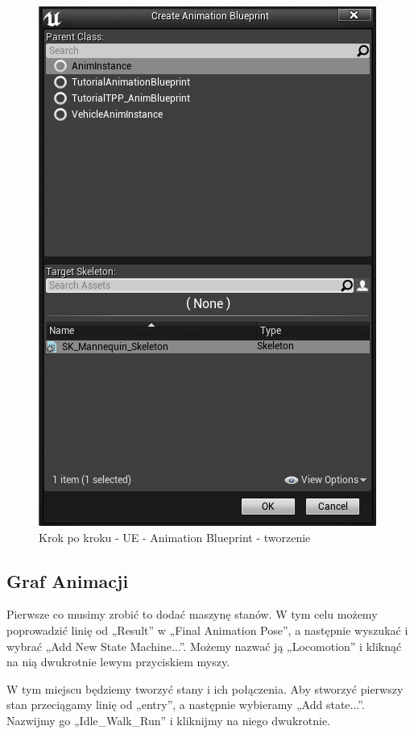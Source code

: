 \documentclass[12pt]{xmgr}
\begin{document}
\begin{figure}[!htb]
    \begin{center}
    \includegraphics[scale=0.75]{Screeny/UeKrokPoKroku/UE-AnimBPcreate.png}
    \end{center}
    \caption{Krok po kroku - UE - Animation Blueprint - tworzenie}
\end{figure}

\newpage
\subsection{Graf Animacji}
Pierwsze co musimy zrobić to dodać maszynę stanów. W tym celu możemy poprowadzić linię od „Result” w „Final Animation Pose”, a następnie wyszukać i wybrać „Add New State Machine...”. Możemy nazwać ją „Locomotion” i kliknąć na nią dwukrotnie lewym przyciskiem myszy.

W tym miejscu będziemy tworzyć stany i ich połączenia. Aby stworzyć pierwszy stan przeciągamy linię od „entry”, a następnie wybieramy „Add state...”. Nazwijmy go „Idle\_Walk\_Run” i kliknijmy na niego dwukrotnie.
\end{document}
